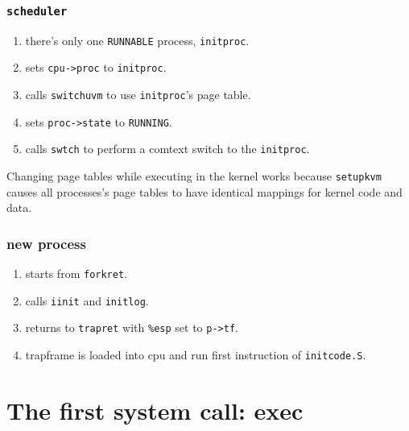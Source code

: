 \documentclass{beamer}
\begin{document}

\begin{frame}[t]
  \frametitle{\texttt{scheduler}}

    \begin{enumerate}
    \item there's only one \texttt{RUNNABLE} process, \texttt{initproc}.
    \item sets \texttt{cpu->proc} to \texttt{initproc}.
    \item calls \texttt{switchuvm} to use \texttt{initproc}'s page table.
    \item sets \texttt{proc->state} to \texttt{RUNNING}.
    \item calls \texttt{swtch} to perform a comtext switch to the \texttt{initproc}.
    \end{enumerate}

    \begin{center}
      Changing page tables while executing in the kernel works because \texttt{setupkvm}
      causes all processes's page tables to have identical mappings for kernel
      code and data.
    \end{center}

\end{frame}


\begin{frame}[t]
  \frametitle{new process}

  \begin{enumerate}
  \item starts from \texttt{forkret}.
  \item calls \texttt{iinit} and \texttt{initlog}.
  \item returns to \texttt{trapret} with \texttt{\%esp} set to \texttt{p->tf}.
  \item trapframe is loaded into cpu and run first instruction of \texttt{initcode.S}.
  \end{enumerate}
  
\end{frame}


\section{The first system call: exec}
\end{document}
